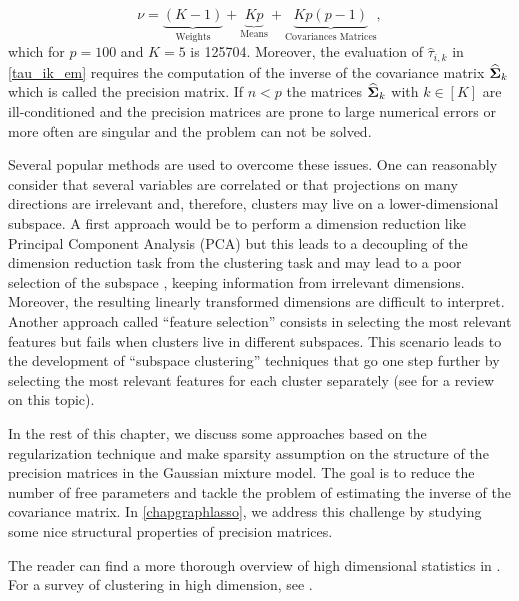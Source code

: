 \begin{equation}
   \nu = \underbrace{(K-1)}_\text{Weights}+ \underbrace{Kp}_\text{Means} + \underbrace{Kp(p-1)}_\text{Covariances Matrices},
 \end{equation}
which for $p=100$ and $K=5$ is 125704. Moreover, the evaluation of $\hat\tau_{i,k}$ in \cref{tau_ik_em} requires the computation of the inverse of the covariance matrix $\widehat{\boldsymbol\Sigma}_k$ which is called the precision matrix. If $n<p$ the matrices $\widehat{\boldsymbol\Sigma}_k$ with $ k\in[K]$ are ill-conditioned and the precision matrices are prone to large numerical errors or more often are singular and the problem can not be solved.

Several popular methods are used to overcome these issues. One can reasonably consider that several variables are correlated or that projections on many directions are irrelevant and, therefore, clusters may live on a lower-dimensional subspace. A first approach would be to perform a dimension reduction like Principal Component Analysis (PCA) but this leads to a decoupling of the dimension reduction task from the clustering task and may lead to a poor selection of the subspace \citep{bouveyron:hal-00750909}, keeping information from irrelevant dimensions. Moreover, the resulting linearly transformed dimensions are difficult to interpret. Another approach called ``feature selection'' consists in selecting the most relevant features but fails when clusters live in different subspaces. This scenario leads to the development of ``subspace clustering'' techniques that go one step further by selecting the most relevant features for each cluster separately (see \citep{Parsons:2004:SCH:1007730.1007731} for a review on this topic). 

In the rest of this chapter, we discuss some approaches based on the regularization technique and make sparsity assumption on the structure of the precision matrices in the Gaussian mixture model. The goal is to reduce the number of free parameters and tackle the problem of estimating the inverse of the covariance matrix. In \cref{chapgraphlasso}, we address this challenge by studying some nice structural properties of precision matrices.

The reader can find a more thorough overview of high dimensional statistics in \cite{giraud2014introduction,Zimek2012,buhlmann2011statistics}. For a survey of clustering in high dimension, see \citep{bouveyron:hal-00750909,Parsons:2004:SCH:1007730.1007731}.

